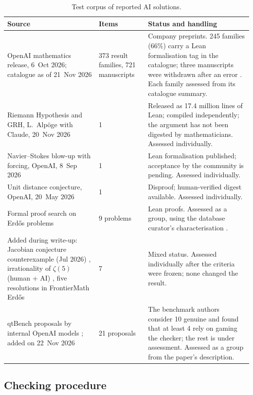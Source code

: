 \documentclass[11pt,a4paper]{article}
\theoremstyle{prob}
\begin{document}
\begin{table}[!htb]
\centering\footnotesize
\begin{tabularx}{\textwidth}{L{4.6cm} L{2.5cm} Y}
\toprule
Source & Items & Status and handling\\
\midrule
OpenAI mathematics release, 6~Oct 2026; catalogue as of 21~Nov 2026 \cite{openairelease,openairepo} & 373 result families, 721 manuscripts & Company preprints. 245 families (66\%) carry a Lean formalisation tag in the catalogue; three manuscripts were withdrawn after an error \cite{kingy}. Each family assessed from its catalogue summary.\\
Riemann Hypothesis and GRH, L.~Alp\"oge with Claude, 20~Nov 2026 \cite{rhscience,rhdev} & 1 & Released as 17.4 million lines of Lean; compiled independently; the argument has not been digested by mathematicians. Assessed individually.\\
Navier--Stokes blow-up with forcing, OpenAI, 8~Sep 2026 \cite{nsopenai,nsnature} & 1 & Lean formalisation published; acceptance by the community is pending. Assessed individually.\\
Unit distance conjecture, OpenAI, 20~May 2026 \cite{udopenai,udremarks} & 1 & Disproof; human-verified digest available. Assessed individually.\\
Formal proof search on Erd\H{o}s problems \cite{nexus} & 9 problems & Lean proofs. Assessed as a group, using the database curator's characterisation \cite{fme}.\\
Added during write-up: Jacobian conjecture counterexample (Jul 2026) \cite{fme}, irrationality of $\zeta(5)$ (human + AI) \cite{fmapery}, five resolutions in FrontierMath Erd\H{o}s \cite{fme} & 7 & Mixed status. Assessed individually after the criteria were frozen; none changed the result.\\
qtBench proposals by internal OpenAI models \cite{combi}; added on 22~Nov 2026 & 21 proposals & The benchmark authors consider 10 genuine and found that at least 4 rely on gaming the checker; the rest is under assessment. Assessed as a group from the paper's description.\\
\bottomrule
\end{tabularx}
\caption{Test corpus of reported AI solutions.}\label{tab:corpus}
\end{table}

\subsection{Checking procedure}
\end{document}
